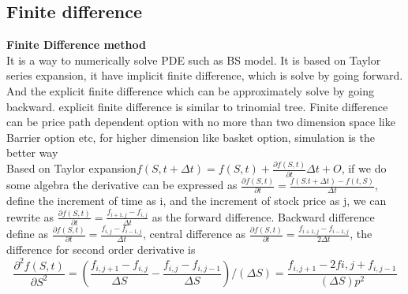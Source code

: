 \documentclass[a4paper,11pt]{article}
\begin{document}
\subsection{Finite difference}
{\bf Finite Difference method}\\
It is a way to numerically solve PDE such as BS model. It is based on Taylor series expansion, it have implicit finite difference, which is solve by going forward. And the explicit finite difference which can be approximately solve by going backward. explicit finite difference is similar to trinomial tree. Finite difference can be price path dependent option with no more than two dimension space like Barrier option etc, for higher dimension like basket option, simulation is the better way \\
Based on Taylor expansion$f(S,t+\Delta t)=f(S,t)+\frac{\partial f(S,t)}{\partial t}\Delta t+O$, if we do some algebra the derivative can be expressed as
 $\frac{\partial f(S,t)}{\partial t}=\frac{f(S.t+\Delta t)-f(t,S)}{\Delta t}$, define the increment of time as i, and the increment of stock price as j, we can rewrite as $\frac{\partial f(S,t)}{\partial t}=\frac{f_{i+1,j}-f_{i,j}}{\Delta t} $ as the forward difference. Backward difference define as $\frac{\partial f(S,t)}{\partial t}=\frac{f_{i,j}-f_{i-1,j}}{\Delta t} $, central difference as $\frac{\partial f(S,t)}{\partial t}=\frac{f_{i+1,j}-f_{i-1,j}}{2\Delta t}$, the difference for second order derivative is $$ \frac{\partial^2 f(S,t)}{\partial S^2}=\left(\frac{f_{i,j+1}-f_{i,j}}{\Delta S}-\frac{f_{i,j}-f_{i,j-1}}{\Delta S}\right)/(\Delta S)=\frac{f_{i,j+1}-2f{i,j}+f_{i,j-1}}{(\Delta S)p^2}$$
\end{document}
